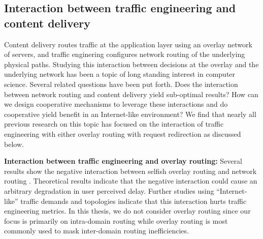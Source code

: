 \subsection{Interaction between traffic engineering and content delivery}
\label{sec:ch2-te-cdn}

Content delivery routes traffic at the application layer using an overlay network of servers, and traffic enginering configures network routing of the underlying physical paths. Studying this interaction between decisions at the overlay and the underlying network has been a topic of long standing interest in computer science. Several related questions have been put forth. Does the interaction between network routing and content delivery yield sub-optimal results? How can we design cooperative mechanisms to leverage these interactions and do cooperative yield benefit in an Internet-like environment? We find that nearly all previous research on this topic has focused on the interaction of traffic engineering with either overlay routing \cite{Roughgarden,selfishQiu} with request redirection \cite{Jiang2009,JohariGameTheory, CATE, P4P} as discussed below. 



\textbf{Interaction between traffic engineering and overlay routing:} Several results show the negative interaction between selfish overlay routing and network routing \cite{Roughgarden,selfishQiu}. Theoretical results indicate that the negative interaction could cause an arbitrary degradation in user perceived delay. Further studies using ``Internet-like'' traffic demands and topologies indicate that this interaction hurts traffic engineering metrics. In this thesis, we do not consider overlay routing since our focus is primarily on intra-domain routing while overlay routing is most commonly used to mask inter-domain routing inefficiencies.

